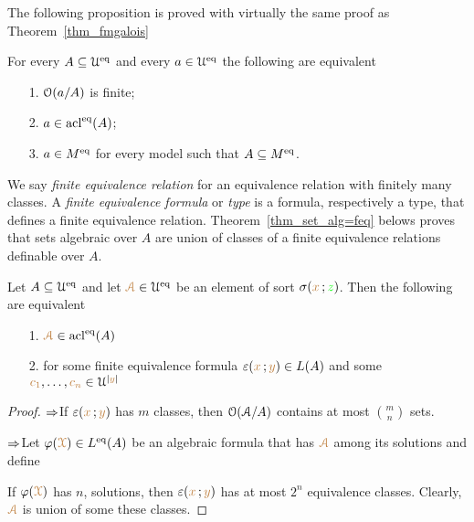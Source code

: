 \documentclass[creche.tex]{subfiles}
\begin{document}
The following proposition is proved with virtually the same proof as Theorem~\ref{thm_fmgalois}

\begin{theorem}\label{thm_Galois_alg=alg}
For every $A\subseteq\EuScript U^{{\rm eq}}$ and every $a\in\EuScript U^{{\rm eq}}$ the following are equivalent
\begin{itemize}
\item[1.] $\EuScript O(a/A)$ is finite;
\item[2.] $a\in\mathop{\rm acl}^{{\rm eq}}(A)$;
\item[3.] $a\in M^{{\rm eq}}$ for every model such that $A\subseteq M^{{\rm eq}}$.\QED
\end{itemize}
\end{theorem}


We say \emph{finite equivalence relation\/} for an equivalence relation with finitely many classes.
A \emph{finite equivalence formula\/} or \emph{type\/} is a formula, respectively a type, that defines a finite equivalence relation.
Theorem~\ref{thm_set_alg=feq} belows proves that sets algebraic over $A$ are union of classes of a finite equivalence relations definable over $A$.


\begin{theorem}\label{thm_set_alg=feq}
Let $A\subseteq\EuScript U^{{\rm eq}}$ and let ${\color{brown}\EuScript A}\in\EuScript U^{{\rm eq}}$ be an element of sort $\sigma({\color{brown} x}\,;{\color{green} z})$.
Then the following are equivalent
\begin{itemize}
\item[1.] ${\color{brown}\EuScript A}\in\mathop{\rm acl}^{{\rm eq}}(A)$
\item[2.] for some finite equivalence formula $\varepsilon({\color{brown} x}\,;{\color{brown} y})\in L(A)$ and some ${\color{brown} c_1},\dots,{\color{brown} c_n}\in\EuScript U^{|{\color{brown} y}|}$
\end{itemize}


\end{theorem}
\begin{proof} $\Rightarrow$\quad If  $\varepsilon({\color{brown} x}\,;{\color{brown} y})$ has $m$ classes, then $\EuScript O(\EuScript A/A)$ contains at most $\displaystyle{m\choose n}$ sets.

$\Rightarrow$\quad Let $\varphi({\color{brown}\EuScript X})\in L^{{\rm eq}}(A)$ be an algebraic formula that has ${\color{brown}\EuScript A}$ among its solutions and define


If $\varphi({\color{brown}\EuScript X})$ has $n$, solutions, then $\varepsilon({\color{brown} x}\,;{\color{brown} y})$ has at most $2^n$ equivalence classes.
Clearly, ${\color{brown}\EuScript A}$ is union of some these classes.
\end{proof}
\end{document}

